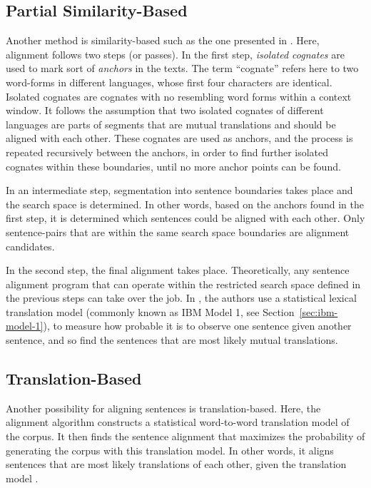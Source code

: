 \subsection{Partial Similarity-Based}
Another method is similarity-based such as the one presented in \cite{simard-plamondon-1996-bilingual}. 
Here, alignment follows two steps (or passes). 
In the first step, \emph{isolated cognates} are used to mark sort of \emph{anchors} in the texts. 
The term \enquote{cognate} refers here to two word-forms in different languages, whose  first four characters are identical. 
Isolated cognates are cognates with no resembling word forms within a context window.
It follows the assumption that two isolated cognates of different languages are parts of segments that are mutual translations and should be aligned with each other. 
These cognates are used as anchors, and the process is repeated recursively between the anchors, in order to find further isolated cognates within these boundaries, until no more anchor points can be found.

In an intermediate step, segmentation into sentence boundaries takes place and the search space is determined. 
In other words, based on the anchors found in the first step, it is determined which sentences could be aligned with each other. 
Only sentence-pairs that are within the same search space boundaries are alignment candidates.

In the second step, the final alignment takes place. 
Theoretically, any sentence alignment program that can operate within the restricted search space defined in the previous steps can take over the job. 
In \cite{simard-plamondon-1996-bilingual}, the authors use a statistical lexical translation model (commonly known as IBM Model 1, see Section~\ref{sec:ibm-model-1}), to measure how probable it is to observe one sentence given another sentence, and so find the sentences that are most likely mutual translations.

\subsection{Translation-Based}

Another possibility for aligning sentences is translation-based. 
Here, the alignment algorithm constructs a statistical word-to-word translation model of the corpus. 
It then finds the sentence alignment that maximizes the probability of generating the corpus with this translation model. 
In other words, it aligns sentences that are most likely translations of each other, given the translation model \autocite{chen-1993-aligning}. 

